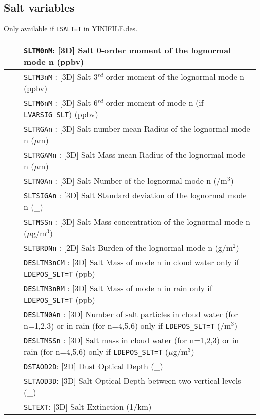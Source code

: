 \subsection{Salt variables}
Only available if \verb|LSALT=T| in YINIFILE.des.
\begin{center}
\begin{makeimage}
\begin{tabular}{|>{\centering}p{3cm}|>{\centering}p{2.5cm}|p{11cm}|}
\hline
\multirow{23}{*}{by default}& &{\tt SLTM0nM}: [3D] Salt 0-order moment of the lognormal mode n (ppbv)\\\cline{3-3}
& &{\tt SLTM3nM} : [3D] Salt 3$^{rd}$-order moment of the lognormal mode n (ppbv)\\\cline{3-3}
& &{\tt SLTM6nM} : [3D] Salt 6$^{rd}$-order moment of mode n 
              {\small(if {\tt LVARSIG\_SLT})} (ppbv)\\\cline{3-3}
& &{\tt SLTRGAn} : [3D] Salt number mean Radius of the lognormal mode n ($\mu$m)
\\\cline{3-3}
& &{\tt SLTRGAMn} : [3D] Salt Mass mean Radius of the lognormal mode n ($\mu$m)\\\cline{3-3}
& &{\tt SLTN0An} : [3D] Salt Number of the lognormal mode n (/m$^3$)\\\cline{3-3}
& &{\tt SLTSIGAn} : [3D] Salt Standard deviation of the lognormal mode n (\_)\\\cline{3-3}
& &{\tt SLTMSSn} : [3D] Salt Mass concentration of the lognormal mode n 
($\mu$g/m$^3$)\\\cline{3-3}
& &{\tt SLTBRDNn} : [2D] Salt Burden of the lognormal mode n (g/m$^2$)\\\cline{3-3}
& &{\tt DESLTM3nCM}  : [3D] Salt Mass of mode n in cloud water only if \verb|LDEPOS_SLT=T| (ppb) \\\cline{3-3}
& &{\tt DESLTM3nRM}  : [3D] Salt  Mass of mode n in rain only if \verb|LDEPOS_SLT=T| (ppb)\\\cline{3-3}
& &{\tt DESLTN0An} : [3D] Number of salt particles in cloud water (for n=1,2,3) or in rain (for n=4,5,6) only if \verb|LDEPOS_SLT=T|  (/m$^3$)\\\cline{3-3}
& &{\tt DESLTMSSn} : [3D] Salt mass in cloud water (for n=1,2,3) or in rain (for n=4,5,6) only if \verb|LDEPOS_SLT=T| ($\mu$g/m$^3$)\\\cline{1-3}
\multirow{3}{*}{NRAD\_3D}& \multirow{3}{*}{$\ge$ 1}&{\tt DSTAOD2D}: [2D] Dust Optical Depth (\_)\\\cline{3-3}
& &{\tt SLTAOD3D}: [3D] Salt Optical Depth between two vertical levels (\_)
\\\cline{3-3}
& &{\tt SLTEXT}: [3D] Salt Extinction (1/km)\\\hline
\end{tabular} 
\end{makeimage}
\end{center}


